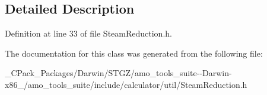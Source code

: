 \subsection{Detailed Description}


Definition at line 33 of file Steam\+Reduction.\+h.



The documentation for this class was generated from the following file\+:\begin{DoxyCompactItemize}
\item 
\+\_\+\+C\+Pack\+\_\+\+Packages/\+Darwin/\+S\+T\+G\+Z/amo\+\_\+tools\+\_\+suite-\/-\/\+Darwin-\/x86\+\_/amo\+\_\+tools\+\_\+suite/include/calculator/util/Steam\+Reduction.\+h\end{DoxyCompactItemize}
